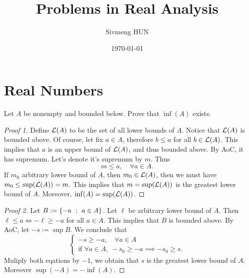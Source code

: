 

\title{Problems in Real Analysis}
\author{Sivmeng HUN}
\date{\today}




\maketitle
\chapter{Real Numbers}

\begin{example}
  Let $A$ be nonempty and bounded below.
  Prove that $\inf(A)$ exists.
\end{example}
\begin{proof}[Proof 1]
  Define $\mathcal L(A)$ to be the set of all lower bounds of $A$.
	Notice that $\mathcal L(A)$ is bounded above. Of course, let
  fix $a\in A$, therefore $b\leq a$ for all $b\in\mathcal L(A)$.
  This implies that $a$ is an upper bound of $\mathcal L(A)$, and thus
  bounded above. By AoC, it has supremum. Let's denote it's
  supremum by $m$. Thus
  \[m\leq a,\quad\forall a\in A.\]
  If $m_0$ arbitrary lower bound of $A$, then $m_0\in\mathcal L(A)$, then
  we must have $m_0\leq \sup(\mathcal L(A))=m$. This implies that
  $m=\sup(\mathcal L(A))$ is the greatest lower bound of $A$.
  Moreover, $\inf(A)=\sup(\mathcal L(A))$.
\end{proof}
\begin{proof}[Proof 2]
  Let $B:=\left\{-a ~:~ a\in A\right\}$. Let $\ell$ be arbitrary lower bound
  of $A$. Then $\ell\leq a\iff -\ell\geq -a$ for all $a\in A$.
  This implies that $B$ is bounded above. By AoC, let
  $-s:=\sup B$. We conclude that
  \[
    \begin{cases}
    	-s \geq -a,\quad \forall a\in A\\
      \text{if }\forall a\in A,~ -s_0\geq -a\implies -s_0\geq s.
    \end{cases}
  \]
  Muliply both eqations by $-1$, we obtain that $s$ is the greatest
  lower bound of $A$. Moreover $\sup(-A)=-\inf(A)$.
\end{proof}




